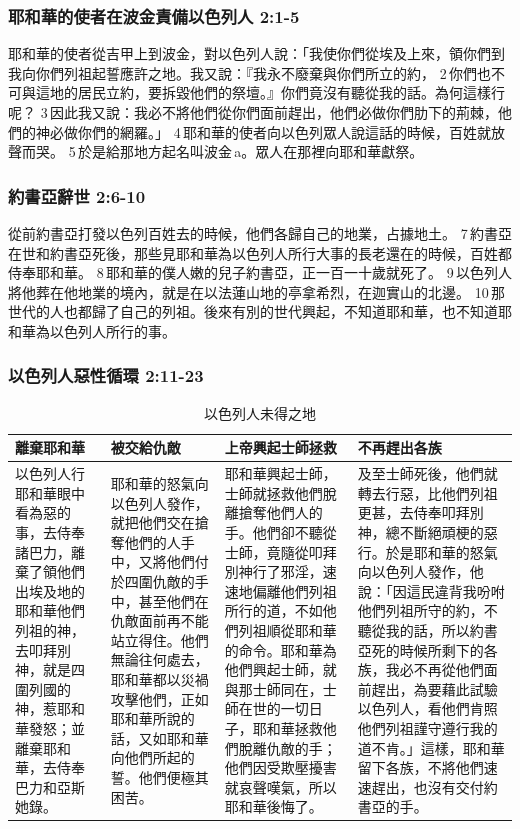  
\subsubsection{耶和華的使者在波金責備以色列人 2:1-5}
耶和華的使者從吉甲上到波金，對以色列人說：「我使你們從埃及上來，領你們到我向你們列祖起誓應許之地。我又說：『我永不廢棄與你們所立的約， 2 你們也不可與這地的居民立約，要拆毀他們的祭壇。』你們竟沒有聽從我的話。為何這樣行呢？ 3 因此我又說：我必不將他們從你們面前趕出，他們必做你們肋下的荊棘，他們的神必做你們的網羅。」 4 耶和華的使者向以色列眾人說這話的時候，百姓就放聲而哭。 5 於是給那地方起名叫波金 a。眾人在那裡向耶和華獻祭。

\subsubsection{約書亞辭世 2:6-10 }
從前約書亞打發以色列百姓去的時候，他們各歸自己的地業，占據地土。 7 約書亞在世和約書亞死後，那些見耶和華為以色列人所行大事的長老還在的時候，百姓都侍奉耶和華。 8 耶和華的僕人嫩的兒子約書亞，正一百一十歲就死了。 9 以色列人將他葬在他地業的境內，就是在以法蓮山地的亭拿希烈，在迦實山的北邊。 10 那世代的人也都歸了自己的列祖。後來有別的世代興起，不知道耶和華，也不知道耶和華為以色列人所行的事。

\subsubsection{以色列人惡性循環 2:11-23 }
\begin{table}[H]
\centering
\begin{tabular}{p{2.7cm}|p{3.7cm}|p{4.5cm}|p{5.6cm}}\hline\hline
離棄耶和華&被交給仇敵&上帝興起士師拯救&不再趕出各族\\\hline
以色列人行耶和華眼中看為惡的事，去侍奉諸巴力，離棄了領他們出埃及地的耶和華他們列祖的神，去叩拜別神，就是四圍列國的神，惹耶和華發怒；並離棄耶和華，去侍奉巴力和亞斯她錄。
&耶和華的怒氣向以色列人發作，就把他們交在搶奪他們的人手中，又將他們付於四圍仇敵的手中，甚至他們在仇敵面前再不能站立得住。他們無論往何處去，耶和華都以災禍攻擊他們，正如耶和華所說的話，又如耶和華向他們所起的誓。他們便極其困苦。
&耶和華興起士師，士師就拯救他們脫離搶奪他們人的手。他們卻不聽從士師，竟隨從叩拜別神行了邪淫，速速地偏離他們列祖所行的道，不如他們列祖順從耶和華的命令。耶和華為他們興起士師，就與那士師同在，士師在世的一切日子，耶和華拯救他們脫離仇敵的手；他們因受欺壓擾害就哀聲嘆氣，所以耶和華後悔了。
&及至士師死後，他們就轉去行惡，比他們列祖更甚，去侍奉叩拜別神，總不斷絕頑梗的惡行。於是耶和華的怒氣向以色列人發作，他說：「因這民違背我吩咐他們列祖所守的約，不聽從我的話，所以約書亞死的時候所剩下的各族，我必不再從他們面前趕出，為要藉此試驗以色列人，看他們肯照他們列祖謹守遵行我的道不肯。」這樣，耶和華留下各族，不將他們速速趕出，也沒有交付約書亞的手。\\\hline
 \end{tabular}
\caption{以色列人未得之地}
\end{table}

